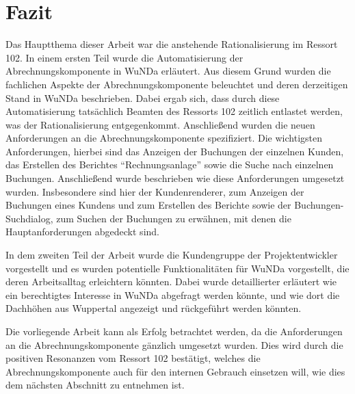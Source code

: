 \section{Fazit}
Das Hauptthema dieser Arbeit war die anstehende Rationalisierung  im Ressort 102.
In einem ersten Teil wurde die Automatisierung der Abrechnungskomponente in \ac{WuNDa} erläutert.
Aus diesem Grund wurden die fachlichen Aspekte der Abrechnungskomponente beleuchtet und deren derzeitigen Stand in \ac{WuNDa} beschrieben.
Dabei ergab sich, dass durch diese Automatisierung tatsächlich Beamten des Ressorts 102 zeitlich entlastet werden, was der Rationalisierung entgegenkommt.
Anschließend wurden die neuen Anforderungen an die Abrechnungskomponente spezifiziert.
Die wichtigsten Anforderungen, hierbei sind das Anzeigen der Buchungen der einzelnen Kunden, das Erstellen des Berichtes \enquote{Rechnungsanlage} sowie die Suche nach einzelnen Buchungen.
Anschließend wurde beschrieben wie diese Anforderungen umgesetzt wurden.
Insbesondere sind hier der Kundenrenderer, zum Anzeigen der Buchungen eines Kundens und zum Erstellen des Berichte sowie der Buchungen-Suchdialog, zum Suchen der Buchungen zu erwähnen, mit denen die Hauptanforderungen abgedeckt sind.

In dem zweiten Teil der Arbeit wurde die Kundengruppe der Projektentwickler vorgestellt und es wurden potentielle Funktionalitäten für \ac{WuNDa} vorgestellt, die deren Arbeitsalltag erleichtern könnten.
Dabei wurde detaillierter erläutert wie ein berechtigtes Interesse in \ac{WuNDa} abgefragt werden könnte, und wie dort die Dachhöhen aus Wuppertal angezeigt und rückgeführt werden könnten.

Die vorliegende Arbeit kann als Erfolg betrachtet werden, da die Anforderungen an die Abrechnungskomponente gänzlich umgesetzt wurden.
Dies wird durch die positiven Resonanzen vom Ressort 102 bestätigt, welches die Abrechnungskomponente auch für den internen Gebrauch einsetzen will, wie dies dem nächsten Abschnitt zu entnehmen ist.


